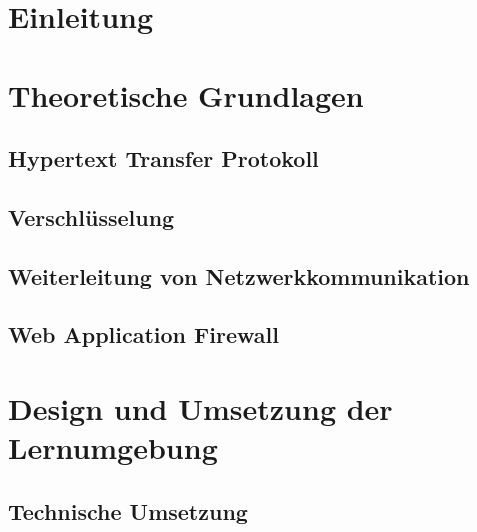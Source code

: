 \documentclass[a4paper, 12pt]{article}
\begin{document}
    
    
    
    

    \section{Einleitung}
    

    \section{Theoretische Grundlagen}
    \label{sec:theoretical-foundations}
    \subsection{Hypertext Transfer Protokoll}
    
    \subsection{Verschlüsselung}
    
    \subsection{Weiterleitung von Netzwerkkommunikation}
    
    \subsection{Web Application Firewall}
    
    \pagebreak

    \section{Design und Umsetzung der Lernumgebung}
    
    \subsection{Technische Umsetzung}
    
\end{document}
